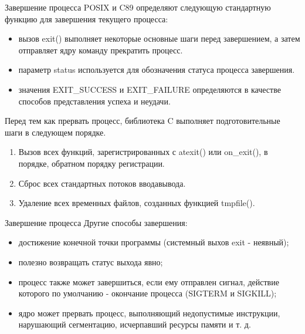 \documentclass{beamer}
\begin{document}
\begin{frame}{Завершение процесса}
POSIX и C89 определяют следующую стандартную функцию для завершения текущего процесса:
\begin{itemize}
\item вызов exit() выполняет некоторые основные шаги перед завершением, а затем
отправляет ядру команду прекратить процесс.
\item параметр status используется для обозначения статуса процесса завершения.
\item значения EXIT\_SUCCESS и EXIT\_FAILURE определяются в качестве способов представления успеха и неудачи. 
\end{itemize}
Перед тем как прервать процесс, библиотека C выполняет подготовительные
шаги в следующем порядке.
\begin{enumerate}
\item Вызов всех функций, зарегистрированных с atexit() или on\_exit(), в порядке,
обратном порядку регистрации.
\item Сброс всех стандартных потоков ввода­вывода.
\item Удаление всех временных файлов, созданных функцией tmpfile().
\end{enumerate}
\end{frame}

\begin{frame}{Завершение процесса}
Другие способы завершения:
\begin{itemize}
\item достижение конечной точки программы (системный выхов exit - неявный);
\item полезно возвращать статус выхода явно;
\item процесс также может завершиться, если ему отправлен сигнал, действие которого по умолчанию - окончание процесса (SIGTERM и SIGKILL);
\item ядро может прервать процесс, выполняющий недопустимые инструкции, нарушающий сегментацию, исчерпавший ресурсы памяти и т. д.
\end{itemize}
\end{frame}
\end{document}
